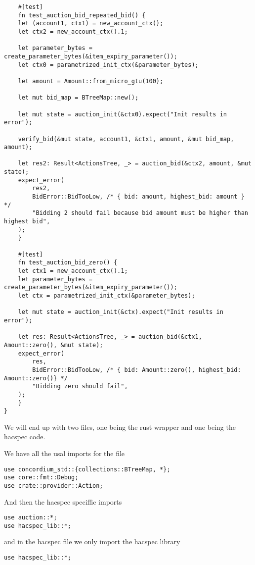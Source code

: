 \documentclass[11pt]{article}
\begin{document}
\begin{verbatim}
    #[test]
    fn test_auction_bid_repeated_bid() {
	let (account1, ctx1) = new_account_ctx();
	let ctx2 = new_account_ctx().1;

	let parameter_bytes = create_parameter_bytes(&item_expiry_parameter());
	let ctx0 = parametrized_init_ctx(&parameter_bytes);

	let amount = Amount::from_micro_gtu(100);

	let mut bid_map = BTreeMap::new();

	let mut state = auction_init(&ctx0).expect("Init results in error");

	verify_bid(&mut state, account1, &ctx1, amount, &mut bid_map, amount);

	let res2: Result<ActionsTree, _> = auction_bid(&ctx2, amount, &mut state);
	expect_error(
	    res2,
	    BidError::BidTooLow, /* { bid: amount, highest_bid: amount } */
	    "Bidding 2 should fail because bid amount must be higher than highest bid",
	);
    }

    #[test]
    fn test_auction_bid_zero() {
	let ctx1 = new_account_ctx().1;
	let parameter_bytes = create_parameter_bytes(&item_expiry_parameter());
	let ctx = parametrized_init_ctx(&parameter_bytes);

	let mut state = auction_init(&ctx).expect("Init results in error");

	let res: Result<ActionsTree, _> = auction_bid(&ctx1, Amount::zero(), &mut state);
	expect_error(
	    res,
	    BidError::BidTooLow, /* { bid: Amount::zero(), highest_bid: Amount::zero()} */
	    "Bidding zero should fail",
	);
    }
}
\end{verbatim}
We will end up with two files, one being the rust wrapper and one being the hacspec code. 

We have all the usal imports for the file
\begin{verbatim}
use concordium_std::{collections::BTreeMap, *};
use core::fmt::Debug;
use crate::provider::Action;
\end{verbatim}

And then the hacspec speciffic imports
\begin{verbatim}
use auction::*;
use hacspec_lib::*;
\end{verbatim}

and in the hacspec file we only import the hacspec library
\begin{verbatim}
use hacspec_lib::*;
\end{verbatim}
\end{document}
